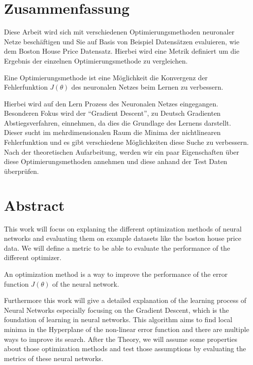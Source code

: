 \section*{Zusammenfassung}

Diese Arbeit wird sich mit verschiedenen 
Optimierungsmethoden neuronaler Netze beschäftigen
und Sie auf Basis von Beispiel Datensätzen evaluieren,
wie dem Boston House Price Datensatz.
Hierbei wird eine Metrik definiert um die Ergebnis der einzelnen 
Optimierungsmethode zu vergleichen. 

Eine Optimierungsmethode ist eine Möglichkeit
die Konvergenz der Fehlerfunktion $J(\theta)$ des neuronalen Netzes
beim Lernen zu verbessern. 
 
Hierbei wird auf den Lern Prozess des Neuronalen
Netzes eingegangen. Besonderen Fokus wird der ``Gradient Descent'',
zu Deutsch Gradienten Abstiegsverfahren, einnehmen, da dies die Grundlage
des Lernens darstellt. Dieser sucht im mehrdimensionalen Raum
die Minima der nichtlinearen Fehlerfunktion und
es gibt verschiedene Möglichkeiten diese Suche zu verbessern.   
Nach der theoretischen Aufarbeitung,
werden wir ein paar Eigenschaften über
diese Optimierungsmethoden annehmen
und diese anhand der Test Daten überprüfen.


\section*{Abstract}

This work will focus on explaning the different optimization methods of neural networks and evaluating them
on example datasets like the boston house price data.
We will define a metric to be able to evaluate the performance 
of the different optimizer.

An optimization method is a way to improve the performance of the error 
function $J(\theta)$ of the neural network. 


Furthermore this work will give a detailed explanation of the learning process of Neural Networks
especially focusing on the Gradient Descent, which is the foundation of learning in neural networks. This algorithm aims to find local minima in the Hyperplane of the non-linear error function and there are multiple ways to improve its search. 
After the Theory, we will assume some properties about those optimization methods and test those assumptions
by evaluating the metrics of these neural networks.

